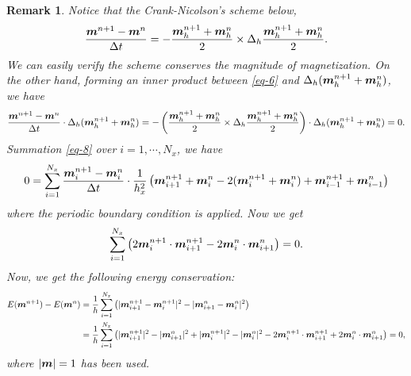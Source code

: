\documentclass[preprint,times,3p]{elsarticle}
\newtheorem{remark}{Remark}
\def\m{\mbox{\boldmath $m$}}
\begin{document}
\begin{remark}
    Notice that the Crank-Nicolson's scheme below,
\begin{align}\label{eq-6}
    \frac{{\m}^{n+1} - {\m}^n}{\Delta t} = -\frac{\m_h^{n+1}+\m_h^n}{2} \times \Delta_h \frac{\m_h^{n+1}+\m_h^n}{2} .
\end{align}
We can easily verify the scheme conserves the magnitude of magnetization. On the other hand, forming an inner product between \cref{eq-6} and $\Delta_h(\m_h^{n+1}+\m_h^n)$, we have
\begin{align}\label{eq-8}
    \frac{{\m}^{n+1} - {\m}^n}{\Delta t} \cdot \Delta_h (\m_h^{n+1}+\m_h^n) = -\left(\frac{\m_h^{n+1}+\m_h^n}{2} \times \Delta_h \frac{\m_h^{n+1}+\m_h^n}{2} \right)\cdot \Delta_h (\m_h^{n+1}+\m_h^n)=0 .
\end{align}
Summation \cref{eq-8} over $i=1,\cdots,N_x$, we have
\begin{align*}
   0=\sum_{i=1}^{N_x}\frac{{\m}_i^{n+1} - {\m}_i^n}{\Delta t} \cdot \frac{1}{h_x^2}\left(\m_{i+1}^{n+1}+\m_{i}^n-2(\m_i^{n+1}+\m_i^n)+\m_{i-1}^{n+1}+\m_{i-1}^n\right)
\end{align*}
where the periodic boundary condition is applied.
Now we get 
\begin{align*}
    \sum_{i=1}^{N_x} \left( 2{\m}_i^{n+1} \cdot {\m}_{i+1}^{n+1} - 2{\m}_i^n \cdot {\m}_{i+1}^n \right) = 0.
\end{align*}
Now, we get the following energy conservation:
\begin{align*}
    \begin{aligned}
E({\m}^{n+1}) - E({\m}^n) 
&= \frac{1}{h} \sum_{i=1}^{N_x} \left( |{\m}_{i+1}^{n+1} - {\m}_i^{n+1}|^2 - |{\m}_{i+1}^n - {\m}_i^n|^2 \right) \\
&= \frac{1}{h} \sum_{i=1}^{N_x} \left( |{\m}_{i+1}^{n+1}|^2 - |{\m}_{i+1}^n|^2 + |{\m}_i^{n+1}|^2 - |{\m}_i^n|^2 - 2{\m}_i^{n+1} \cdot {\m}_{i+1}^{n+1} + 2{\m}_i^n \cdot {\m}_{i+1}^n \right) = 0,
\end{aligned}
\end{align*}
where $|\m|=1$ has been used. 


\end{remark}
\end{document}
